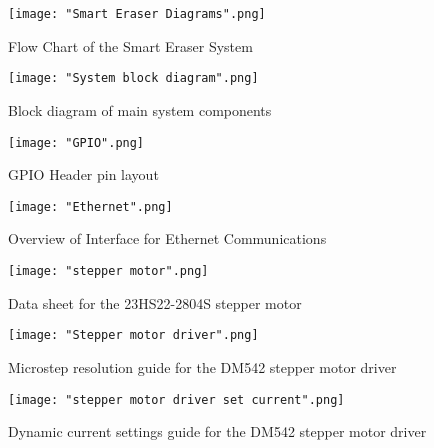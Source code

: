 \begin{figure}[h!]
	\centering
	{\texttt{[image: "Smart Eraser Diagrams".png]}}
	\caption{Flow Chart of the Smart Eraser System}
	\label{fig:FC1}
\end{figure}

\pagebreak[4]

\begin{figure}[h!]
	\centering
	{\texttt{[image: "System block diagram".png]}}
	\caption{Block diagram of main system components}
	\label{fig:BD1}
\end{figure}

\pagebreak[4]

\begin{figure}[h!]
	\centering
	{\texttt{[image: "GPIO".png]}}
	\caption{GPIO Header pin layout}
	\label{fig:GPIO}
\end{figure}

\pagebreak[4]

\begin{figure}[h!]
	\centering
	{\texttt{[image: "Ethernet".png]}}
	\caption{Overview of Interface for Ethernet Communications}
	\label{fig:Ether}
\end{figure}

\pagebreak[4]


\begin{figure}[h!]
	\centering
	{\texttt{[image: "stepper motor".png]}}
	\caption{Data sheet for the 23HS22-2804S stepper motor}
	\label{fig:SM}
\end{figure}

\pagebreak[4]

\begin{figure}[h!]
	\centering
	{\texttt{[image: "Stepper motor driver".png]}}
	\caption{Microstep resolution guide for the DM542 stepper motor driver}
	\label{fig:SMD1}
\end{figure}

\pagebreak[4]

\begin{figure}[h!]
	\centering
	{\texttt{[image: "stepper motor driver set current".png]}}
	\caption{Dynamic current settings guide for the DM542 stepper motor driver}
	\label{fig:SMD2}
\end{figure}

\pagebreak[4]

